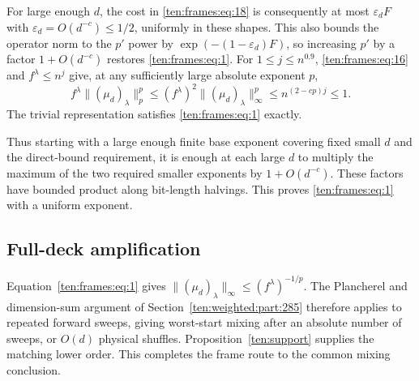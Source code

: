 For large enough \(d\), the cost in \eqref{ten:frames:eq:18} is consequently at most \(\varepsilon_d F\) with \(\varepsilon_d=O(d^{-c})\le1/2\), uniformly in these shapes. This also bounds the operator norm to the \(p'\) power by \(\exp(-(1-\varepsilon_d)F)\), so increasing \(p'\) by a factor \(1+O(d^{-c})\) restores \eqref{ten:frames:eq:1}. For $1\le j\le n^{0.9}$, \eqref{ten:frames:eq:16} and $f^\lambda\le n^j$ give, at any sufficiently large absolute exponent $p$,
\[
 f^\lambda\|(\mu_d)_\lambda\|_p^p
 \le(f^\lambda)^2\|(\mu_d)_\lambda\|_\infty^p
 \le n^{(2-cp)j}\le1.
\] The trivial representation satisfies \eqref{ten:frames:eq:1} exactly.

Thus starting with a large enough finite base exponent covering fixed small \(d\) and the direct-bound requirement, it is enough at each large \(d\) to multiply the maximum of the two required smaller exponents by \(1+O(d^{-c})\). These factors have bounded product along bit-length halvings. This proves \eqref{ten:frames:eq:1} with a uniform exponent.

\subsection{Full-deck amplification}
\label{ten:frames:part:231}
Equation~\eqref{ten:frames:eq:1} gives $\|(\mu_d)_\lambda\|_\infty\le(f^\lambda)^{-1/p}$. The Plancherel and dimension-sum argument of Section~\ref{ten:weighted:part:285} therefore applies to repeated forward sweeps, giving worst-start mixing after an absolute number of sweeps, or $O(d)$ physical shuffles. Proposition~\ref{ten:support} supplies the matching lower order. This completes the frame route to the common mixing conclusion.
